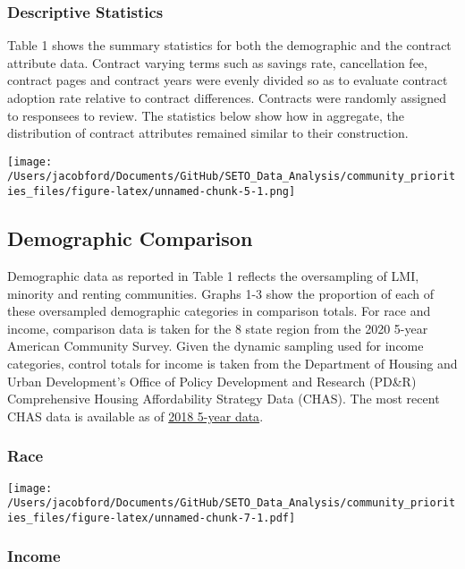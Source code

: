 \documentclass[
]{article}
\begin{document}
\hypertarget{descriptive-statistics}{%
\subsubsection{Descriptive Statistics}\label{descriptive-statistics}}

Table 1 shows the summary statistics for both the demographic and the
contract attribute data. Contract varying terms such as savings rate,
cancellation fee, contract pages and contract years were evenly divided
so as to evaluate contract adoption rate relative to contract
differences. Contracts were randomly assigned to responsees to review.
The statistics below show how in aggregate, the distribution of contract
attributes remained similar to their construction.

\texttt{[image: /Users/jacobford/Documents/GitHub/SETO\_Data\_Analysis/community\_priorities\_files/figure-latex/unnamed-chunk-5-1.png]}

\hypertarget{demographic-comparison}{%
\subsection{Demographic Comparison}\label{demographic-comparison}}

Demographic data as reported in Table 1 reflects the oversampling of
LMI, minority and renting communities. Graphs 1-3 show the proportion of
each of these oversampled demographic categories in comparison totals.
For race and income, comparison data is taken for the 8 state region
from the 2020 5-year American Community Survey. Given the dynamic
sampling used for income categories, control totals for income is taken
from the Department of Housing and Urban Development's Office of Policy
Development and Research (PD\&R) Comprehensive Housing Affordability
Strategy Data (CHAS). The most recent CHAS data is available as of
\href{https://www.huduser.gov/portal/datasets/cp.html}{2018 5-year
data}.

\hypertarget{race}{%
\subsubsection{Race}\label{race}}

\texttt{[image: /Users/jacobford/Documents/GitHub/SETO\_Data\_Analysis/community\_priorities\_files/figure-latex/unnamed-chunk-7-1.pdf]}

\hypertarget{income}{%
\subsubsection{Income}\label{income}}
\end{document}
